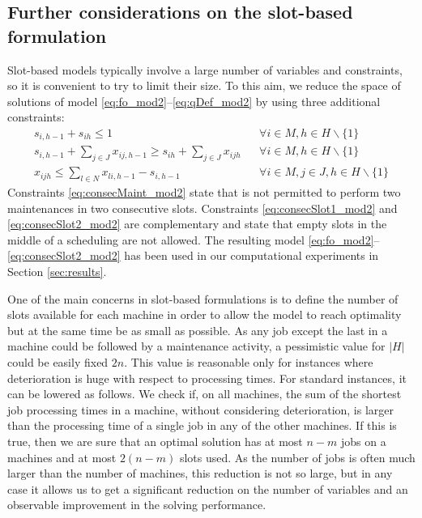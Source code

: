 \documentclass[a4paper,11pt]{article}
\begin{document}
\subsection{Further considerations on the slot-based formulation}
%
Slot-based models typically involve a large number of variables and constraints, so it is convenient to try to limit their size. 
To this aim, we reduce the space of solutions of model \eqref{eq:fo_mod2}--\eqref{eq:qDef_mod2} by using three additional constraints:
\begin{eqnarray}
\label{eq:consecMaint_mod2} s_{i,h-1} + s_{ih} \leq 1 && \forall i \in M, h \in H\backslash\{1\}\\
\label{eq:consecSlot1_mod2} s_{i,h-1} + \sum_{j \in J}{x_{ij,h-1}} \geq s_{ih} + \sum_{j \in J}{x_{ijh}}  && \forall i \in M, h \in H\backslash\{1\}\\
\label{eq:consecSlot2_mod2} x_{ijh}  \leq \sum_{l \in N}{x_{li,h-1}} - s_{i,h-1}  && \forall i \in M, j \in J, h \in H\backslash\{1\}
\end{eqnarray}
Constraints \eqref{eq:consecMaint_mod2} state that is not permitted to perform two maintenances in two consecutive slots. Constraints \eqref{eq:consecSlot1_mod2} and \eqref{eq:consecSlot2_mod2} are complementary and state that empty slots in the middle of a scheduling are not allowed. The resulting model 
\eqref{eq:fo_mod2}--\eqref{eq:consecSlot2_mod2} has been used in our computational experiments in Section \ref{sec:results}. 

One of the main concerns in slot-based formulations is to define the number of slots available for each machine in order to allow the model to reach optimality but at the same time be as small as possible. As any job except the last in a machine could be followed by a maintenance activity, a pessimistic value for $|H|$ could be easily fixed $2n$.  This value is reasonable only for instances where deterioration is huge with respect to processing times.  For standard instances, it can be lowered as follows. We check if, on all machines, the sum of the shortest job processing times in a machine, without considering deterioration, is larger than the processing time of a single job in any of the other machines. If this is true, then we are sure that an optimal solution has at most $n-m$ jobs on a machines and at most $2(n-m)$ slots used. As the number of jobs is often much larger than the number of machines, this reduction is not so large, but in any case it allows us to get a significant reduction on the number of variables and an observable improvement in the solving performance.  
\end{document}
